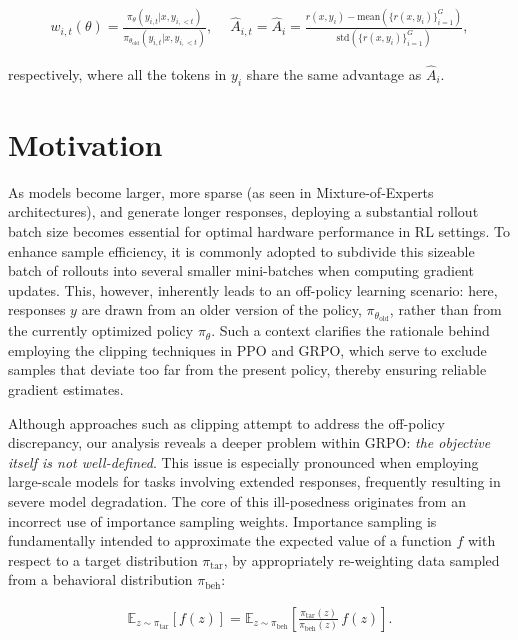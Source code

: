 \begin{align}
    w_{i,t}(\theta)=\frac{ \pi_{\theta} (y_{i,t} | x, y_{i,<t}) }{ \pi_{\theta_\text{old}} (y_{i,t} | x,y_{i,<t})},\quad\ 
    \widehat{A}_{i,t} = \widehat{A}_{i} = \frac{r(x, y_i) - \mathrm{mean} \left( \{ r(x, y_i) \}_{i=1}^G \right) }{ \mathrm{std} \left( \{ r(x, y_i) \}_{i=1}^G \right) },
\end{align}

respectively, where all the tokens in $y_i$ share the same advantage as $\widehat{A}_{i}$.

\section{Motivation}
\label{sec:motivation}

As models become larger, more sparse (as seen in Mixture-of-Experts architectures), and generate longer responses, deploying a substantial rollout batch size becomes essential for optimal hardware performance in RL settings. To enhance sample efficiency, it is commonly adopted to subdivide this sizeable batch of rollouts into several smaller mini-batches when computing gradient updates. This, however, inherently leads to an off-policy learning scenario: here, responses $y$ are drawn from an older version of the policy, $\pi_{\theta_\text{old}}$, rather than from the currently optimized policy $\pi_\theta$. Such a context clarifies the rationale behind employing the clipping techniques in PPO and GRPO, which serve to exclude samples that deviate too far from the present policy, thereby ensuring reliable gradient estimates.

Although approaches such as clipping attempt to address the off-policy discrepancy, our analysis reveals a deeper problem within GRPO: \textit{the objective itself is not well-defined}. This issue is especially pronounced when employing large-scale models for tasks involving extended responses, frequently resulting in severe model degradation. The core of this ill-posedness originates from an incorrect use of importance sampling weights. Importance sampling is fundamentally intended to approximate the expected value of a function $f$ with respect to a target distribution $\pi_\text{tar}$, by appropriately re-weighting data sampled from a behavioral distribution $\pi_\text{beh}$:

\begin{align}
\mathbb{E}_{z \sim \pi_\text{tar}} \left[ f(z) \right] = \mathbb{E}_{z \sim \pi_\text{beh}} \left[ \frac{ \pi_\text{tar} (z) }{ \pi_\text{beh} (z)} \, f(z) \right].
\end{align}

